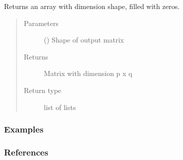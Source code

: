 \documentclass[letterpaper,10pt,english]{sphinxmanual}
\begin{document}
\begin{fulllineitems}
Returns an array with dimension shape, filled with zeros.
\begin{quote}\begin{description}
\item[{Parameters}] \leavevmode
{} () \textendash{} Shape of output matrix

\item[{Returns}] \leavevmode
{} \textendash{} Matrix with dimension p x q

\item[{Return type}] \leavevmode
list of lists

\end{description}\end{quote}
\subsubsection*{Examples}

\begin{sphinxVerbatim}[commandchars=\\\{\}]
 
 
 
\end{sphinxVerbatim}

\end{fulllineitems}

\subsubsection*{References}


\renewcommand{\indexname}{Python Module Index}
\begin{sphinxtheindex}
\let\bigletter\sphinxstyleindexlettergroup
\bigletter{a}
\item\relax{}
\item\relax{}
\end{sphinxtheindex}

\renewcommand{\indexname}{Index}
\printindex
\end{document}
